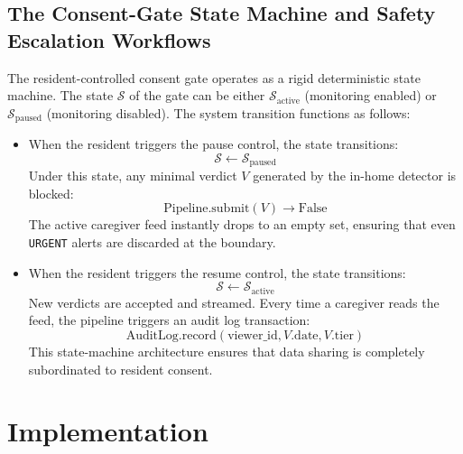 \documentclass[conference]{IEEEtran}
\begin{document}
\subsection{The Consent-Gate State Machine and Safety Escalation Workflows}
The resident-controlled consent gate operates as a rigid deterministic state machine. The state $\mathcal{S}$ of the gate can be either $\mathcal{S}_{\text{active}}$ (monitoring enabled) or $\mathcal{S}_{\text{paused}}$ (monitoring disabled). The system transition functions as follows:
\begin{itemize}
  \item When the resident triggers the pause control, the state transitions:
  \begin{equation}
  \mathcal{S} \leftarrow \mathcal{S}_{\text{paused}}
  \end{equation}
  Under this state, any minimal verdict $V$ generated by the in-home detector is blocked:
  \begin{equation}
  \text{Pipeline.submit}(V) \rightarrow \text{False}
  \end{equation}
  The active caregiver feed instantly drops to an empty set, ensuring that even \texttt{URGENT} alerts are discarded at the boundary.
  \item When the resident triggers the resume control, the state transitions:
  \begin{equation}
  \mathcal{S} \leftarrow \mathcal{S}_{\text{active}}
  \end{equation}
  New verdicts are accepted and streamed. Every time a caregiver reads the feed, the pipeline triggers an audit log transaction:
  \begin{equation}
  \text{AuditLog.record}(\text{viewer\_id}, V.\text{date}, V.\text{tier})
  \end{equation}
  This state-machine architecture ensures that data sharing is completely subordinated to resident consent.
\end{itemize}

\section{Implementation}
\end{document}
